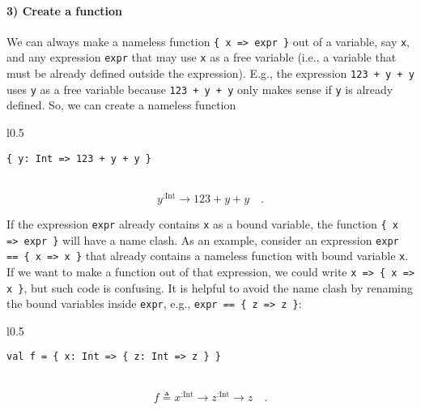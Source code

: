 \paragraph{3) Create a function}

We can always make a nameless function \lstinline!{ x => expr }!
out of a variable, say \lstinline!x!, and any expression \lstinline!expr!
that may use \lstinline!x! as a free variable
(i.e., a variable that must be already defined outside the expression).
E.g., the expression \lstinline!123 + y + y! uses \lstinline!y!
as a free variable because \lstinline!123 + y + y! only makes sense
if \lstinline!y! is already defined. So, we can create a nameless
function

\begin{wrapfigure}{l}{0.5\columnwidth}%
\vspace{-0.65\baselineskip}
\begin{lstlisting}
{ y: Int => 123 + y + y }
\end{lstlisting}

\vspace{-0.25\baselineskip}
\end{wrapfigure}%

~\vspace{-0.35\baselineskip}
\[
y^{:\text{Int}}\rightarrow123+y+y\quad.
\]
\vspace{-0.85\baselineskip}

If the expression \lstinline!expr! already contains \lstinline!x!
as a bound variable, the function \lstinline!{ x => expr }! will
have a name clash. As an example, consider an expression \lstinline!expr == { x => x }!
that already contains a nameless function with bound variable \lstinline!x!.
If we want to make a function out of that expression, we could write
\lstinline!x => { x => x }!, but such code is confusing. It is helpful
to avoid the name clash by renaming the bound variables inside \lstinline!expr!,
e.g., \lstinline!expr == { z => z }!:

\begin{wrapfigure}{l}{0.5\columnwidth}%
\vspace{-0.65\baselineskip}
\begin{lstlisting}
val f = { x: Int => { z: Int => z } }
\end{lstlisting}

\vspace{-0.25\baselineskip}
\end{wrapfigure}%

~\vspace{-0.35\baselineskip}
\[
f\triangleq x^{:\text{Int}}\rightarrow z^{:\text{Int}}\rightarrow z\quad.
\]
\vspace{-0.85\baselineskip}


